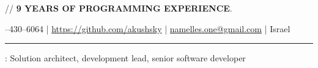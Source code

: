 \documentclass[11pt]{article}
\newif\ifdetailed
\begin{document}
%
{\small{// {\textbf{9 YEARS OF PROGRAMMING EXPERIENCE}}. }}

\vspace{0.5em}

--430--6064    |    \url{https://github.com/akushsky}   |   \href{mailto:namelles.one@gmail.com}{namelles.one@gmail.com}  |  Israel  \ifdetailed | Sivan 11, 5748 \fi

\vspace{0.5em}

\hrule

\vspace{1.5em}

\ifdetailed
\noindent {\textbf{CAREER OBJECTIVE}}: To gain \textbf{international experience} in IT related role (solution architect, senior software developer, development lead). Preferably working with highload systems, big data and distributed software.
\else
{}: Solution architect, development lead, senior software developer
\fi

\vspace{1em}
\end{document}
